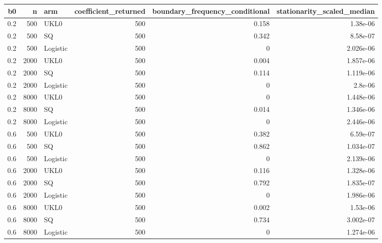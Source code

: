 \begin{tabular}{rrlrrr}
\toprule
b0 & n & arm & coefficient\_returned & boundary\_frequency\_conditional & stationarity\_scaled\_median \\
\midrule
0.2 & 500 & UKL0 & 500 & 0.158 & 1.38e-06 \\
0.2 & 500 & SQ & 500 & 0.342 & 8.58e-07 \\
0.2 & 500 & Logistic & 500 & 0 & 2.026e-06 \\
0.2 & 2000 & UKL0 & 500 & 0.004 & 1.857e-06 \\
0.2 & 2000 & SQ & 500 & 0.114 & 1.119e-06 \\
0.2 & 2000 & Logistic & 500 & 0 & 2.8e-06 \\
0.2 & 8000 & UKL0 & 500 & 0 & 1.448e-06 \\
0.2 & 8000 & SQ & 500 & 0.014 & 1.346e-06 \\
0.2 & 8000 & Logistic & 500 & 0 & 2.446e-06 \\
0.6 & 500 & UKL0 & 500 & 0.382 & 6.59e-07 \\
0.6 & 500 & SQ & 500 & 0.862 & 1.034e-07 \\
0.6 & 500 & Logistic & 500 & 0 & 2.139e-06 \\
0.6 & 2000 & UKL0 & 500 & 0.116 & 1.328e-06 \\
0.6 & 2000 & SQ & 500 & 0.792 & 1.835e-07 \\
0.6 & 2000 & Logistic & 500 & 0 & 1.986e-06 \\
0.6 & 8000 & UKL0 & 500 & 0.002 & 1.53e-06 \\
0.6 & 8000 & SQ & 500 & 0.734 & 3.002e-07 \\
0.6 & 8000 & Logistic & 500 & 0 & 1.274e-06 \\
\bottomrule
\end{tabular}
